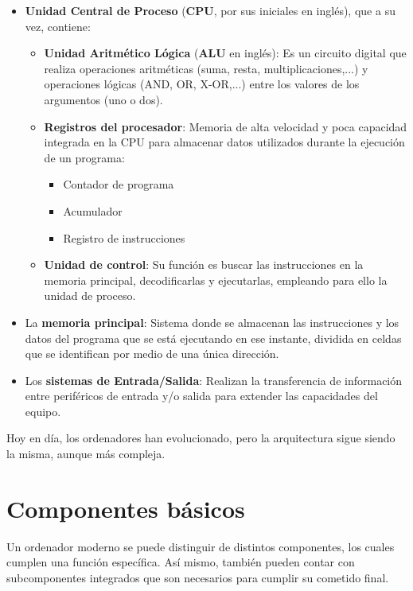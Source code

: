 \begin{itemize}
    \item \textbf{Unidad Central de Proceso} (\textbf{CPU}, por sus iniciales en inglés), que a su vez, contiene:
    \begin{itemize}
        \item \textbf{Unidad Aritmético Lógica} (\textbf{ALU} en inglés): Es un circuito digital que realiza operaciones aritméticas (suma, resta, multiplicaciones,...) y operaciones lógicas (AND, OR, X-OR,...) entre los valores de los argumentos (uno o dos).
        \item \textbf{Registros del procesador}: Memoria de alta velocidad y poca capacidad integrada en la CPU para almacenar datos utilizados durante la ejecución de un programa:
        \begin{itemize}
            \item Contador de programa
            \item Acumulador
            \item Registro de instrucciones
        \end{itemize}
        \item \textbf{Unidad de control}: Su función es buscar las instrucciones en la memoria principal, decodificarlas y ejecutarlas, empleando para ello la unidad de proceso.
    \end{itemize}
    \item La \textbf{memoria principal}: Sistema donde se almacenan las instrucciones y los datos del programa que se está ejecutando en ese instante, dividida en celdas que se identifican por medio de una única dirección.
    \item Los \textbf{sistemas de Entrada/Salida}: Realizan la transferencia de información entre periféricos de entrada y/o salida para extender las capacidades del equipo.
\end{itemize}


Hoy en día, los ordenadores han evolucionado, pero la arquitectura sigue siendo la misma, aunque más compleja.



\section{Componentes básicos}

Un ordenador moderno se puede distinguir de distintos componentes, los cuales cumplen una función específica. Así mismo, también pueden contar con subcomponentes integrados que son necesarios para cumplir su cometido final.

